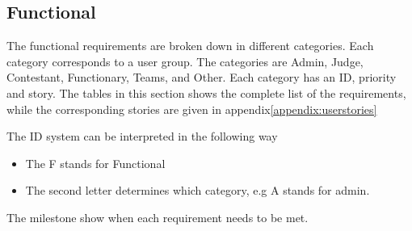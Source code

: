 \subsection{Functional}\label{section:functionalreq}
The functional requirements are broken down in different categories.
Each category corresponds to a user group. The categories are Admin, Judge,
Contestant, Functionary, Teams, and Other. Each category has an ID, priority
and story. The tables in this section shows the complete list of the
requirements, while the corresponding stories are given in
appendix\ref{appendix:userstories}

The ID system can be interpreted in the following way
\begin{itemize}
    \item The F stands for Functional
    \item The second letter determines which category, e.g A stands for admin.
\end{itemize}

The milestone show when each requirement needs to be met.

\pagebreak
